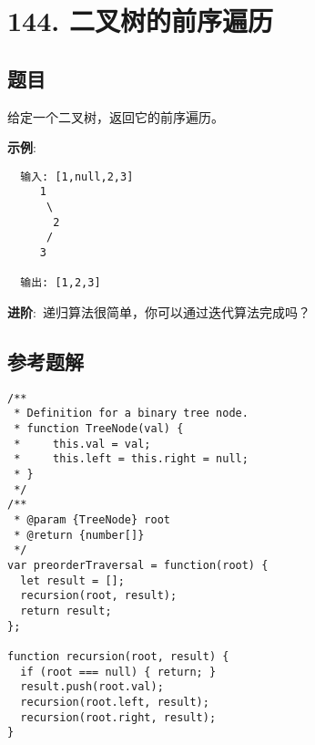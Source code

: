 \newpage
\section{144. 二叉树的前序遍历}
\label{leetcode:144}

\subsection{题目}

给定一个二叉树，返回它的前序遍历。

\textbf{示例}:

\begin{verbatim}
  输入: [1,null,2,3]  
     1
      \
       2
      /
     3 

  输出: [1,2,3]
\end{verbatim}

\textbf{进阶}: 递归算法很简单，你可以通过迭代算法完成吗？

\subsection{参考题解}

\begin{verbatim}
/**
 * Definition for a binary tree node.
 * function TreeNode(val) {
 *     this.val = val;
 *     this.left = this.right = null;
 * }
 */
/**
 * @param {TreeNode} root
 * @return {number[]}
 */
var preorderTraversal = function(root) {
  let result = [];
  recursion(root, result);
  return result;
};

function recursion(root, result) {
  if (root === null) { return; }
  result.push(root.val);
  recursion(root.left, result);
  recursion(root.right, result);
}
\end{verbatim}
